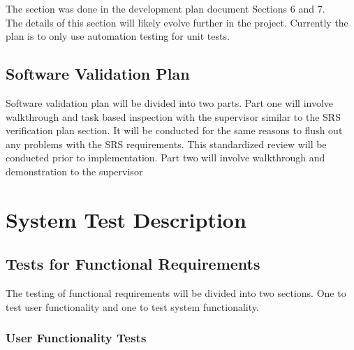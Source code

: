 \documentclass[12pt, titlepage]{article}
\begin{document}


The section was done in the development plan document Sections 6 and 7. \\

The details of this section will likely evolve further
in the project. Currently the plan is to only use 
automation testing for unit tests. 

\subsection{Software Validation Plan}

  
Software validation plan will be divided into two parts. Part one will involve walkthrough and task based inspection with the supervisor similar to the SRS 
verification plan section. It will be conducted for the same reasons to flush out any problems with the SRS requirements. This standardized review will be conducted prior to implementation. Part two will involve walkthrough and demonstration to the supervisor



\section{System Test Description}
	
\subsection{Tests for Functional Requirements}

The testing of functional requirements will be divided into two sections. One to test user functionality and one to test system functionality. 

\subsubsection{User Functionality Tests}
\end{document}
